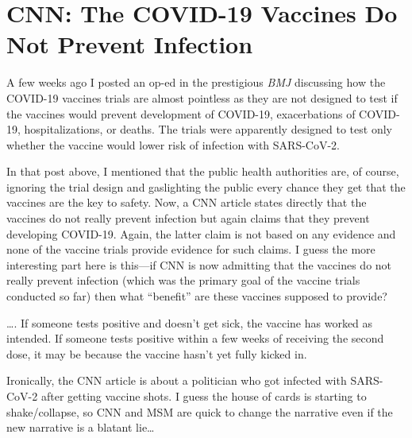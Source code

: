 \chapter{CNN: The COVID-19 Vaccines Do Not Prevent Infection}

\begin{refsection}

A few weeks ago I posted an op-ed in the prestigious \textit{BMJ} discussing how the COVID-19 vaccines trials are almost pointless as they are not designed to test if the vaccines would prevent development of COVID-19, exacerbations of COVID-19, hospitalizations, or deaths. The trials were apparently designed to test only whether the vaccine would lower risk of infection with SARS-CoV-2.

In that post above, I mentioned that the public health authorities are, of course, ignoring the trial design and gaslighting the public every chance they get that the vaccines are the key to safety. Now, a CNN article states directly that the vaccines do not really prevent infection but again claims that they prevent developing COVID-19. Again, the latter claim is not based on any evidence and none of the vaccine trials provide evidence for such claims. I guess the more interesting part here is this---if CNN is now admitting that the vaccines do not really prevent infection (which was the primary goal of the vaccine trials conducted so far) then what \enquote{benefit} are these vaccines supposed to provide?

\begin{tcolorbox}[quote]

\dots{}. If someone tests positive and doesn't get sick, the vaccine has worked as intended. If someone tests positive within a few weeks of receiving the second dose, it may be because the vaccine hasn't yet fully kicked in.\textsuperscript{\cite{urlasd98yw}}

\end{tcolorbox}

Ironically, the CNN article is about a politician who got infected with SARS-CoV-2 after getting  vaccine shots. I guess the house of cards is starting to shake/collapse, so CNN and MSM are quick to change the narrative even if the new narrative is a blatant lie\dots{}


\printbibliography[heading=subbibliography]

\end{refsection}